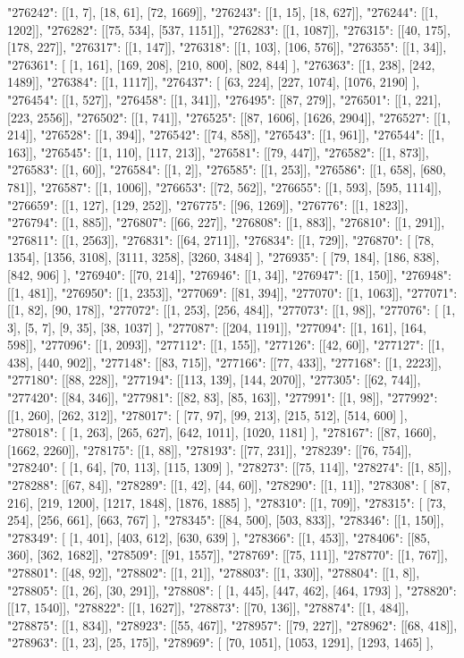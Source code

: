"276242": [[1, 7], [18, 61], [72, 1669]], "276243": [[1, 15], [18, 627]], "276244": [[1, 1202]], "276282": [[75, 534], [537, 1151]], "276283": [[1, 1087]], "276315": [[40, 175], [178, 227]], "276317": [[1, 147]], "276318": [[1, 103], [106, 576]], "276355": [[1, 34]], "276361": [   [1, 161],   [169, 208],   [210, 800],   [802, 844] ], "276363": [[1, 238], [242, 1489]], "276384": [[1, 1117]], "276437": [   [63, 224],   [227, 1074],   [1076, 2190] ], "276454": [[1, 527]], "276458": [[1, 341]], "276495": [[87, 279]], "276501": [[1, 221], [223, 2556]], "276502": [[1, 741]], "276525": [[87, 1606], [1626, 2904]], "276527": [[1, 214]], "276528": [[1, 394]], "276542": [[74, 858]], "276543": [[1, 961]], "276544": [[1, 163]], "276545": [[1, 110], [117, 213]], "276581": [[79, 447]], "276582": [[1, 873]], "276583": [[1, 60]], "276584": [[1, 2]], "276585": [[1, 253]], "276586": [[1, 658], [680, 781]], "276587": [[1, 1006]], "276653": [[72, 562]], "276655": [[1, 593], [595, 1114]], "276659": [[1, 127], [129, 252]], "276775": [[96, 1269]], "276776": [[1, 1823]], "276794": [[1, 885]], "276807": [[66, 227]], "276808": [[1, 883]], "276810": [[1, 291]], "276811": [[1, 2563]], "276831": [[64, 2711]], "276834": [[1, 729]], "276870": [   [78, 1354],   [1356, 3108],   [3111, 3258],   [3260, 3484] ], "276935": [   [79, 184],   [186, 838],   [842, 906] ], "276940": [[70, 214]], "276946": [[1, 34]], "276947": [[1, 150]], "276948": [[1, 481]], "276950": [[1, 2353]], "277069": [[81, 394]], "277070": [[1, 1063]], "277071": [[1, 82], [90, 178]], "277072": [[1, 253], [256, 484]], "277073": [[1, 98]], "277076": [   [1, 3],   [5, 7],   [9, 35],   [38, 1037] ], "277087": [[204, 1191]], "277094": [[1, 161], [164, 598]], "277096": [[1, 2093]], "277112": [[1, 155]], "277126": [[42, 60]], "277127": [[1, 438], [440, 902]], "277148": [[83, 715]], "277166": [[77, 433]], "277168": [[1, 2223]], "277180": [[88, 228]], "277194": [[113, 139], [144, 2070]], "277305": [[62, 744]], "277420": [[84, 346]], "277981": [[82, 83], [85, 163]], "277991": [[1, 98]], "277992": [[1, 260], [262, 312]], "278017": [   [77, 97],   [99, 213],   [215, 512],   [514, 600] ], "278018": [   [1, 263],   [265, 627],   [642, 1011],   [1020, 1181] ], "278167": [[87, 1660], [1662, 2260]], "278175": [[1, 88]], "278193": [[77, 231]], "278239": [[76, 754]], "278240": [   [1, 64],   [70, 113],   [115, 1309] ], "278273": [[75, 114]], "278274": [[1, 85]], "278288": [[67, 84]], "278289": [[1, 42], [44, 60]], "278290": [[1, 11]], "278308": [   [87, 216],   [219, 1200],   [1217, 1848],   [1876, 1885] ], "278310": [[1, 709]], "278315": [   [73, 254],   [256, 661],   [663, 767] ], "278345": [[84, 500], [503, 833]], "278346": [[1, 150]], "278349": [   [1, 401],   [403, 612],   [630, 639] ], "278366": [[1, 453]], "278406": [[85, 360], [362, 1682]], "278509": [[91, 1557]], "278769": [[75, 111]], "278770": [[1, 767]], "278801": [[48, 92]], "278802": [[1, 21]], "278803": [[1, 330]], "278804": [[1, 8]], "278805": [[1, 26], [30, 291]], "278808": [   [1, 445],   [447, 462],   [464, 1793] ], "278820": [[17, 1540]], "278822": [[1, 1627]], "278873": [[70, 136]], "278874": [[1, 484]], "278875": [[1, 834]], "278923": [[55, 467]], "278957": [[79, 227]], "278962": [[68, 418]], "278963": [[1, 23], [25, 175]], "278969": [   [70, 1051],   [1053, 1291],   [1293, 1465] ], 